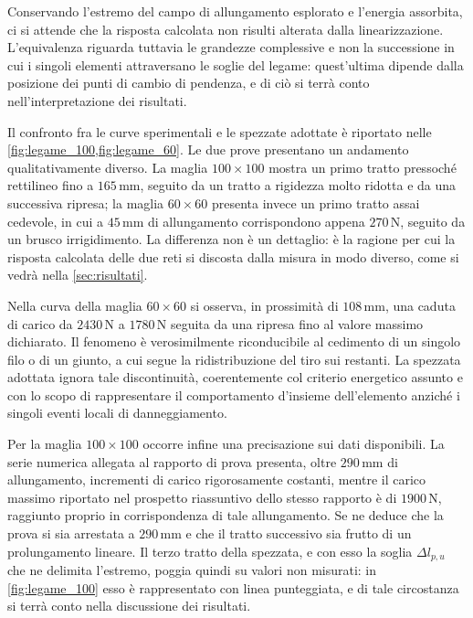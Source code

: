 Conservando l'estremo del campo di allungamento esplorato e l'energia assorbita, ci si attende che la risposta calcolata non risulti alterata dalla linearizzazione. L'equivalenza riguarda tuttavia le grandezze complessive e non la successione in cui i singoli elementi attraversano le soglie del legame: quest'ultima dipende dalla posizione dei punti di cambio di pendenza, e di ciò si terrà conto nell'interpretazione dei risultati. 

Il confronto fra le curve sperimentali e le spezzate adottate è riportato nelle \cref{fig:legame_100,fig:legame_60}. Le due prove presentano un andamento qualitativamente diverso. La maglia $100\times100$ mostra un primo tratto pressoché rettilineo fino a $165\, \text{mm}$, seguito da un tratto a rigidezza molto ridotta e da una successiva ripresa; la maglia $60\times60$ presenta invece un primo tratto assai cedevole, in cui a $45\, \text{mm}$ di allungamento corrispondono appena $270\,\text{N}$, seguito da un brusco irrigidimento. La differenza non è un dettaglio: è la ragione per cui la risposta calcolata delle due reti si discosta dalla misura in modo diverso, come si vedrà nella \cref{sec:risultati}.

Nella curva della maglia $60\times60$ si osserva, in prossimità di $108\, \text{mm}$, una caduta di carico da $2430\, \text{N}$ a $1780\,\text{N}$ seguita da una ripresa fino al valore massimo dichiarato. Il fenomeno è verosimilmente riconducibile al cedimento di un singolo filo o di un giunto, a cui segue la ridistribuzione del tiro sui restanti. La spezzata adottata ignora tale discontinuità, coerentemente col criterio energetico assunto e con lo scopo di rappresentare il comportamento d'insieme dell'elemento anziché i singoli eventi locali di danneggiamento. 

Per la maglia $100\times100$ occorre infine una precisazione sui dati disponibili. La serie numerica allegata al rapporto di prova presenta, oltre $290\,\text{mm}$ di allungamento, incrementi di carico rigorosamente costanti, mentre il carico massimo riportato nel prospetto riassuntivo dello stesso rapporto è di $1900\,\text{N}$, raggiunto proprio in corrispondenza di tale allungamento. Se ne deduce che la prova si sia arrestata a $290\,\text{mm}$ e che il tratto successivo sia frutto di un prolungamento lineare. Il terzo tratto della spezzata, e con esso la soglia $\Delta l_{p,u}$ che ne delimita l'estremo, poggia quindi su valori non misurati: in \cref{fig:legame_100} esso è rappresentato con linea punteggiata, e di tale circostanza si terrà conto nella discussione dei risultati. 


